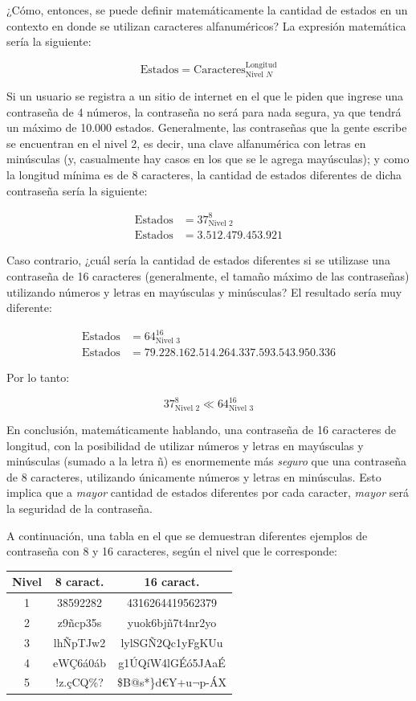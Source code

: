 \documentclass[12pt,a4paper,twoside]{book}
\begin{document}
¿Cómo, entonces, se puede definir matemáticamente la cantidad de estados en un contexto en donde se utilizan caracteres alfanuméricos? La expresión matemática sería la siguiente:

\[
\text{Estados} = \text{Caracteres}^{\text{Longitud}}_{\text{Nivel } N}
\]

Si un usuario se registra a un sitio de internet en el que le piden que ingrese una contraseña de 4 números, la contraseña no será para nada segura, ya que tendrá un máximo de 10.000 estados. Generalmente, las contraseñas que la gente escribe se encuentran en el nivel 2, es decir, una clave alfanumérica con letras en minúsculas (y, casualmente hay casos en los que se le agrega mayúsculas); y como la longitud mínima es de 8 caracteres, la cantidad de estados diferentes de dicha contraseña sería la siguiente:

\begin{align*}
\text{Estados} &= 37^{8}_{\text{Nivel } 2} \\
\text{Estados} &= 3.512.479.453.921
\end{align*}

Caso contrario, ¿cuál sería la cantidad de estados diferentes si se utilizase una contraseña de 16 caracteres (generalmente, el tamaño máximo de las contraseñas) utilizando números y letras en mayúsculas y minúsculas? El resultado sería muy diferente:

\begin{align*}
\text{Estados} &= 64^{16}_{\text{Nivel } 3} \\
\text{Estados} &= 79.228.162.514.264.337.593.543.950.336
\end{align*}

Por lo tanto:

\[
37^{8}_{\text{Nivel } 2} \ll 64^{16}_{\text{Nivel } 3}
\]

En conclusión, matemáticamente hablando, una contraseña de 16 caracteres de longitud, con la posibilidad de utilizar números y letras en mayúsculas y minúsculas (sumado a la letra ñ) es enormemente más \textit{seguro} que una contraseña de 8 caracteres, utilizando únicamente números y letras en minúsculas. Esto implica que a \textit{mayor} cantidad de estados diferentes por cada caracter, \textit{mayor} será la seguridad de la contraseña.

A continuación, una tabla en el que se demuestran diferentes ejemplos de contraseña con 8 y 16 caracteres, según el nivel que le corresponde:

\begin{center}
\begin{tabular}{|c|c|c|}
\hline 
\textbf{Nivel} & \textbf{8 caract.} & \textbf{16 caract.} \\ \hline
1 & 38592282 & 4316264419562379 \\ \hline
2 & z9ñcp35s & yuok6bjñ7t4nr2yo \\ \hline
3 & lhÑpTJw2 & lylSGÑ2Qc1yFgKUu \\ \hline
4 & eWÇ6á0áb & g1ÚQíW4lGÉó5JAaÉ \\ \hline
5 & !z.çCQ\%? & \$B@s*\}d€Y+u$ \neg $p-ÁX \\ \hline
\end{tabular} 
\end{center}
\end{document}
